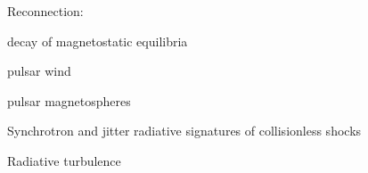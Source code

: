 \documentclass{aa}
\begin{document}
Reconnection:
\citep{Jaroschek_2009}
\citep{Cerutti_2013, Cerutti_2014, Cerutti_2014a}
\citep{Kagan_2016, Kagan_2016b}
\citep{Hakobyan_2019}
\citep{Werner_2019}
\citep{Schoeffler_2019}


decay of magnetostatic equilibria 
\citep{Yuan_2016}
\citep{Nalewajko_2018}

pulsar wind
\citep{Cerutti_2017}

pulsar magnetospheres
\citep{Cerutti_2016a}
\citep{Philippov_2018}


Synchrotron and jitter radiative signatures of collisionless shocks
\citep{Medvedev_2009}
\citep{Sironi_2009}
\citep{Kirk_2010}
\citep{Nishikawa_2011}

Radiative turbulence
\citep{Zhdankin_2019}











\end{document}
